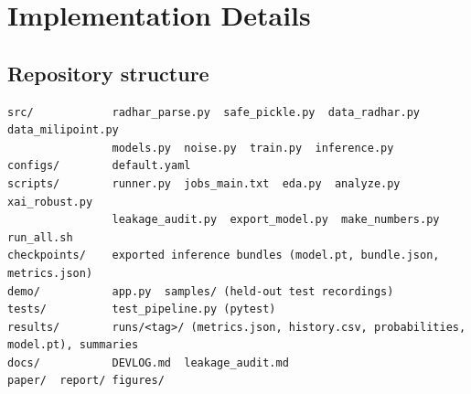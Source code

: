 \chapter{Implementation Details}

\section{Repository structure}
\begin{lstlisting}[numbers=none]
src/            radhar_parse.py  safe_pickle.py  data_radhar.py  data_milipoint.py
                models.py  noise.py  train.py  inference.py
configs/        default.yaml
scripts/        runner.py  jobs_main.txt  eda.py  analyze.py  xai_robust.py
                leakage_audit.py  export_model.py  make_numbers.py  run_all.sh
checkpoints/    exported inference bundles (model.pt, bundle.json, metrics.json)
demo/           app.py  samples/ (held-out test recordings)
tests/          test_pipeline.py (pytest)
results/        runs/<tag>/ (metrics.json, history.csv, probabilities, model.pt), summaries
docs/           DEVLOG.md  leakage_audit.md
paper/  report/ figures/
\end{lstlisting}

